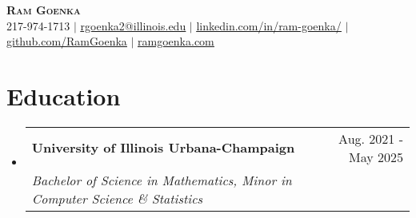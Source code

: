 \documentclass[letterpaper,11pt]{article}
\makeatletter
\newcommand{\resumeSubheading}[4]{
  \vspace{-2pt}\item
    \begin{tabular*}{0.97\textwidth}[t]{l@{\extracolsep{\fill}}r}
      \textbf{#1} & #2 \\
      \textit{\small#3} & \textit{\small #4} \\
    \end{tabular*}\vspace{-7pt}
}
\newcommand{\resumeSubheading}[4]{
  \vspace{-2pt}\item
    \begin{tabular*}{0.97\textwidth}[t]{l@{\extracolsep{\fill}}r}
      \textbf{#1} & #2 \\
      \textit{\small#3} & \textit{\small #4} \\
    \end{tabular*}\vspace{-7pt}}
\newcommand{\resumeSubHeadingListStart}{\begin{itemize}[leftmargin=0.15in, label={}]}
\newcommand{\resumeSubHeadingListEnd}{\end{itemize}}
\makeatother
\begin{document}
\begin{center}
    \textbf{\Huge \scshape Ram Goenka} \\ \vspace{1pt}
    \small 217-974-1713 $|$ \href{mailto:rgoenka2@illinois.edu}{\underline{rgoenka2@illinois.edu}} $|$ 
    \href{https://www.linkedin.com/in/ram-goenka/}{\underline{linkedin.com/in/ram-goenka/}} $|$
    \href{https://github.com/RamGoenka}{\underline{github.com/RamGoenka}} $|$
    \href{http://ramgoenka.com/}{\underline{ramgoenka.com}}
\end{center}

\section{Education}
  \resumeSubHeadingListStart
    \resumeSubheading
      {University of Illinois Urbana-Champaign}{Aug. 2021 - May 2025}
      {Bachelor of Science in Mathematics, Minor in Computer Science \& Statistics}{}
  \resumeSubHeadingListEnd


\end{document}

